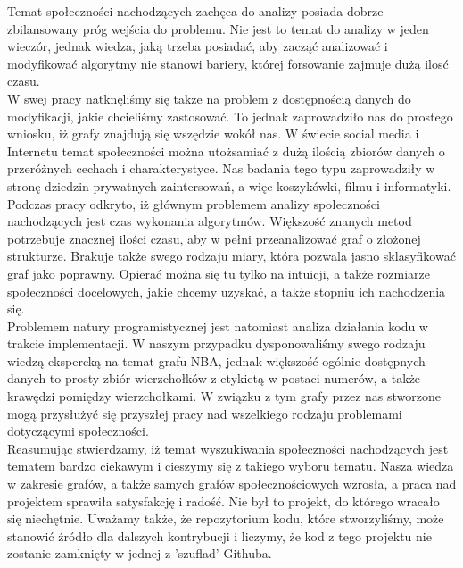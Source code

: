 \documentclass{article}
\begin{document}
Temat społeczności nachodzących zachęca do analizy posiada dobrze zbilansowany próg wejścia do problemu. Nie jest to temat do analizy w jeden wieczór, jednak wiedza, jaką trzeba posiadać, aby zacząć analizować i modyfikować algorytmy nie stanowi bariery, której forsowanie zajmuje dużą ilosć czasu. \\

W swej pracy natknęliśmy się także na problem z dostępnością danych do modyfikacji, jakie chcieliśmy zastosować. To jednak zaprowadziło nas do prostego wniosku, iż grafy znajdują się wszędzie wokół nas. W świecie social media i Internetu temat społeczności można utożsamiać z dużą ilością zbiorów danych o przeróżnych cechach i charakterystyce. Nas badania tego typu zaprowadziły w stronę dziedzin prywatnych zaintersowań, a więc koszykówki, filmu i informatyki. \\

Podczas pracy odkryto, iż głównym problemem analizy społeczności nachodzących jest czas wykonania algorytmów. Większość znanych metod potrzebuje znacznej ilości czasu, aby w pełni przeanalizować graf o złożonej strukturze. Brakuje także swego rodzaju miary, która pozwala jasno sklasyfikować graf jako poprawny. Opierać można się tu tylko na intuicji, a także rozmiarze społeczności docelowych, jakie chcemy uzyskać, a także stopniu ich nachodzenia się. \\

Problemem natury programistycznej jest natomiast analiza działania kodu w trakcie implementacji. W naszym przypadku dysponowaliśmy swego rodzaju wiedzą ekspercką na temat grafu NBA, jednak większość ogólnie dostępnych danych to prosty zbiór wierzchołków z etykietą w postaci numerów, a także krawędzi pomiędzy wierzchołkami. W związku z tym grafy przez nas stworzone mogą przysłużyć się przyszłej pracy nad wszelkiego rodzaju problemami dotyczącymi społeczności. \\

Reasumując stwierdzamy, iż temat wyszukiwania społeczności nachodzących jest tematem bardzo ciekawym i cieszymy się z takiego wyboru tematu. Nasza wiedza w zakresie grafów, a także samych grafów społecznościowych wzrosła, a praca nad projektem sprawiła satysfakcję i radość. Nie był to projekt, do którego wracało się niechętnie. Uważamy także, że repozytorium kodu, które stworzyliśmy, może stanowić źródło dla dalszych kontrybucji i liczymy, że kod z tego projektu nie zostanie zamknięty w jednej z 'szuflad' Githuba. \\
\newpage
\printbibliography
\end{document}
